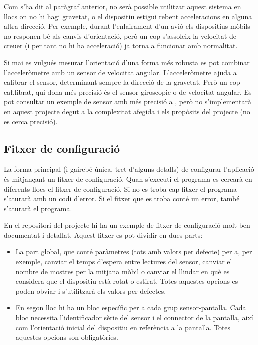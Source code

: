 Com s'ha dit al paràgraf anterior, no serà possible utilitzar aquest sistema en
llocs on no hi hagi gravetat, o el dispositiu estigui rebent acceleracions en
alguna altra direcció. Per exemple, durant l'enlairament d'un avió els
dispositius mòbils no responen bé als canvis d'orientació, però un cop
s'assoleix la velocitat de creuer (i per tant no hi ha acceleració) ja torna
a funcionar amb normalitat.

Si mai es vulgués mesurar l'orientació d'una forma més robusta es pot combinar
l'acceleròmetre amb un sensor de velocitat angular. L'acceleròmetre ajuda a
calibrar el sensor, determinant sempre la direcció de la gravetat. Però un
cop ca\l.librat, qui dona més precisió és el sensor giroscopic o de velocitat
angular. Es pot consultar un exemple de sensor amb més precisió a
\cite{6702711}, però no
s'implementarà en aquest projecte degut a la complexitat afegida i els propòsits
del projecte (no es cerca precisió).

\subsection{Fitxer de configuració}

La forma principal (i gairebé única, tret d'alguns detalls) de configurar
l'aplicació és mitjançant un fitxer de configuració. Quan s'executi el programa
es cercarà en diferents llocs el fitxer de configuració. Si no es troba cap
fitxer el programa s'aturarà amb un codi d'error. Si el fitxer que es troba
conté un error, també s'aturarà el programa.

En el repositori del projecte hi ha un exemple de fitxer de configuració molt
ben documentat i detallat. Aquest fitxer es pot dividir en dues parts:

\begin{itemize}
    \item La part global, que conté paràmetres (tots amb valors per defecte) per
    a, per exemple, canviar el temps d'espera entre lectures del sensor, canviar
    el nombre de mostres per la mitjana mòbil o canviar el llindar en què es
    considera que el dispositiu està rotat o estirat. Totes aquestes opcions es
    poden obviar i s'utilitzarà els valors per defectes.
    \item En segon lloc hi ha un bloc específic per a cada grup sensor-pantalla.
    Cada bloc necessita l'identificador sèrie del sensor i el connector de la
    pantalla, així com l'orientació inicial del dispositiu en referència a la
    pantalla. Totes aquestes opcions son obligatòries.
\end{itemize}

